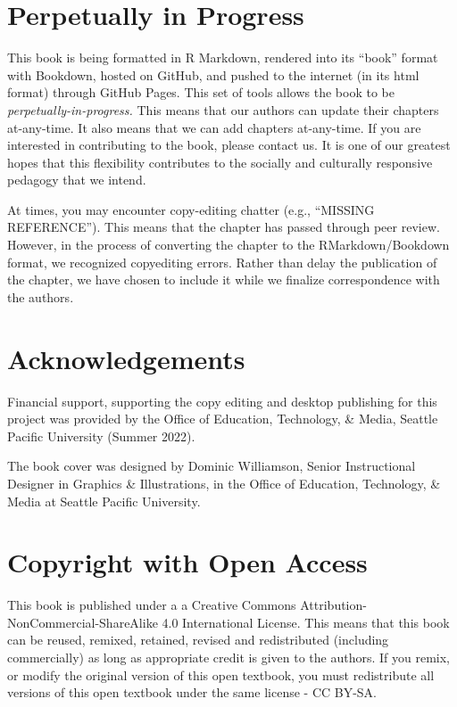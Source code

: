 \documentclass[
  11pt,
]{book}
\begin{document}
\section*{Perpetually in Progress}\label{perpetually-in-progress}


This book is being formatted in R Markdown, rendered into its ``book'' format with Bookdown, hosted on GitHub, and pushed to the internet (in its html format) through GitHub Pages. This set of tools allows the book to be \emph{perpetually-in-progress.} This means that our authors can update their chapters at-any-time. It also means that we can add chapters at-any-time. If you are interested in contributing to the book, please contact us. It is one of our greatest hopes that this flexibility contributes to the socially and culturally responsive pedagogy that we intend.

At times, you may encounter copy-editing chatter (e.g., ``MISSING REFERENCE''). This means that the chapter has passed through peer review. However, in the process of converting the chapter to the RMarkdown/Bookdown format, we recognized copyediting errors. Rather than delay the publication of the chapter, we have chosen to include it while we finalize correspondence with the authors.

\section*{Acknowledgements}\label{acknowledgements}


Financial support, supporting the copy editing and desktop publishing for this project was provided by the Office of Education, Technology, \& Media, Seattle Pacific University (Summer 2022).

The book cover was designed by Dominic Williamson, Senior Instructional Designer in Graphics \& Illustrations, in the Office of Education, Technology, \& Media at Seattle Pacific University.

\section*{Copyright with Open Access}\label{copyright-with-open-access}


This book is published under a a Creative Commons Attribution-NonCommercial-ShareAlike 4.0 International License. This means that this book can be reused, remixed, retained, revised and redistributed (including commercially) as long as appropriate credit is given to the authors. If you remix, or modify the original version of this open textbook, you must redistribute all versions of this open textbook under the same license - CC BY-SA.
\end{document}
